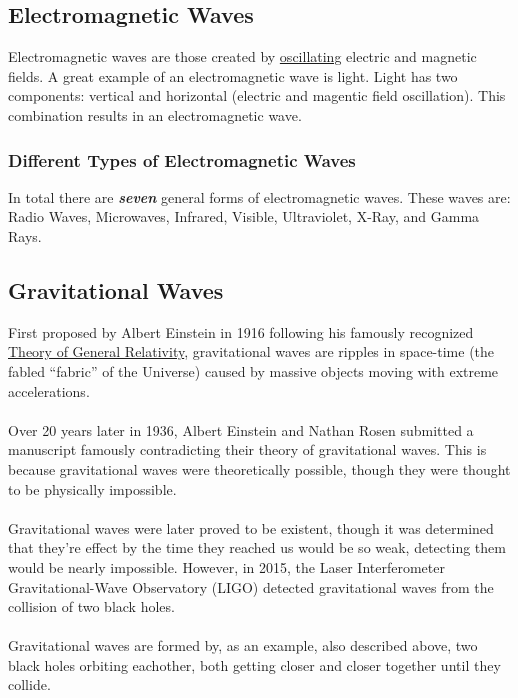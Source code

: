 \documentclass{article}
\begin{document}
\subsection{Electromagnetic Waves}
Electromagnetic waves are those created by \hyperref[sec:oscillation]{oscillating} electric and magnetic fields. A great example of an electromagnetic wave is light. Light has two components: vertical and horizontal (electric and magentic field oscillation). This combination results in an electromagnetic wave.

\subsubsection{Different Types of Electromagnetic Waves}
In total there are \textbf{\textit{seven}} general forms of electromagnetic waves. These waves are: Radio Waves, Microwaves, Infrared, Visible, Ultraviolet, X-Ray, and Gamma Rays.

\subsection{Gravitational Waves}
First proposed by Albert Einstein in 1916 following his famously recognized \hyperref[sec:generalrelativity]{Theory of General Relativity}, gravitational waves are ripples in space-time (the fabled “fabric” of the Universe) caused by massive objects moving with extreme accelerations.\\\\
Over 20 years later in 1936, Albert Einstein and Nathan Rosen submitted a manuscript famously contradicting their theory of gravitational waves. This is because gravitational waves were theoretically possible, though they were thought to be physically impossible. \\\\
Gravitational waves were later proved to be existent, though it was determined that they're effect by the time they reached us would be so weak, detecting them would be nearly impossible. However, in 2015, the Laser Interferometer Gravitational-Wave Observatory (LIGO) detected gravitational waves from the collision of two black holes.\\\\
Gravitational waves are formed by, as an example, also described above, two black holes orbiting eachother, both getting closer and closer together until they collide.
\end{document}
